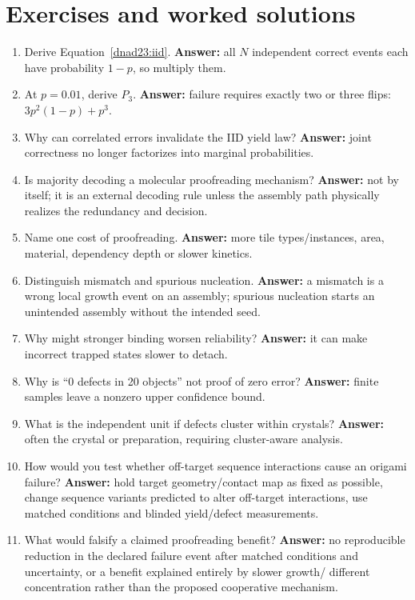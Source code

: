 \section{Exercises and worked solutions}
\begin{enumerate}
\item Derive Equation~\ref{dnad23:iid}. \textbf{Answer:} all $N$ independent
correct events each have probability $1-p$, so multiply them.
\item At $p=0.01$, derive $P_3$. \textbf{Answer:} failure requires exactly two or
three flips: $3p^2(1-p)+p^3$.
\item Why can correlated errors invalidate the IID yield law?
\textbf{Answer:} joint correctness no longer factorizes into marginal probabilities.
\item Is majority decoding a molecular proofreading mechanism?
\textbf{Answer:} not by itself; it is an external decoding rule unless the assembly
path physically realizes the redundancy and decision.
\item Name one cost of proofreading. \textbf{Answer:} more tile types/instances,
area, material, dependency depth or slower kinetics.
\item Distinguish mismatch and spurious nucleation. \textbf{Answer:} a mismatch is
a wrong local growth event on an assembly; spurious nucleation starts an unintended
assembly without the intended seed.
\item Why might stronger binding worsen reliability? \textbf{Answer:} it can make
incorrect trapped states slower to detach.
\item Why is ``0 defects in 20 objects'' not proof of zero error?
\textbf{Answer:} finite samples leave a nonzero upper confidence bound.
\item What is the independent unit if defects cluster within crystals?
\textbf{Answer:} often the crystal or preparation, requiring cluster-aware analysis.
\item How would you test whether off-target sequence interactions cause an origami
failure? \textbf{Answer:} hold target geometry/contact map as fixed as possible,
change sequence variants predicted to alter off-target interactions, use matched
conditions and blinded yield/defect measurements.
\item What would falsify a claimed proofreading benefit?
\textbf{Answer:} no reproducible reduction in the declared failure event after
matched conditions and uncertainty, or a benefit explained entirely by slower growth/
different concentration rather than the proposed cooperative mechanism.

\end{enumerate}
